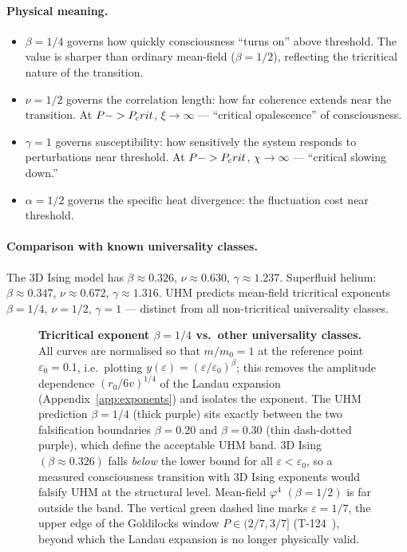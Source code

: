 \paragraph{Physical meaning.}
\begin{itemize}[leftmargin=2em]
  \item $\beta = 1/4$ governs how quickly consciousness ``turns on'' above threshold.
        The value is sharper than ordinary mean-field ($\beta = 1/2$), reflecting the
        tricritical nature of the transition.
  \item $\nu = 1/2$ governs the correlation length: how far coherence extends near the
        transition. At $P -> P_crit$, $\xi \to \infty$ --- ``critical opalescence'' of
        consciousness.
  \item $\gamma = 1$ governs susceptibility: how sensitively the system responds to
        perturbations near threshold. At $P -> P_crit$, $\chi \to \infty$ --- ``critical
        slowing down.''
  \item $\alpha = 1/2$ governs the specific heat divergence: the fluctuation cost near
        threshold.
\end{itemize}

\paragraph{Comparison with known universality classes.}
The 3D Ising model has $\beta \approx 0.326$, $\nu \approx 0.630$, $\gamma \approx 1.237$.
Superfluid helium: $\beta \approx 0.347$, $\nu \approx 0.672$, $\gamma \approx 1.316$.
UHM predicts mean-field tricritical exponents $\beta = 1/4$, $\nu = 1/2$, $\gamma = 1$
--- distinct from all non-tricritical universality classes.

\begin{figure}[H]
\centering

\caption{\textbf{Tricritical exponent $\beta = 1/4$ vs.\ other universality
classes.} All curves are normalised so that $m/m_0 = 1$ at the reference
point $\varepsilon_0 = 0.1$, i.e.\ plotting
$y(\varepsilon) = (\varepsilon/\varepsilon_{0})^{\beta}$; this removes the
amplitude dependence $(r_0/6v)^{1/4}$ of the Landau expansion
(Appendix~\ref{app:exponents}) and isolates the exponent. The UHM
prediction $\beta = 1/4$ (thick purple) sits exactly between the two
falsification boundaries $\beta = 0.20$ and $\beta = 0.30$ (thin
dash-dotted purple), which define the acceptable UHM band. 3D Ising
$(\beta \approx 0.326)$ falls \emph{below} the lower bound for all
$\varepsilon < \varepsilon_0$, so a measured consciousness transition
with 3D Ising exponents would falsify UHM at the structural level.
Mean-field $\varphi^{4}$ $(\beta = 1/2)$ is far outside the band. The
vertical green dashed line marks $\varepsilon = 1/7$, the upper edge of
the Goldilocks window $P \in (2/7, 3/7]$ (T-124~), beyond
which the Landau expansion is no longer physically valid.}
\label{fig:exponents}
\end{figure}

